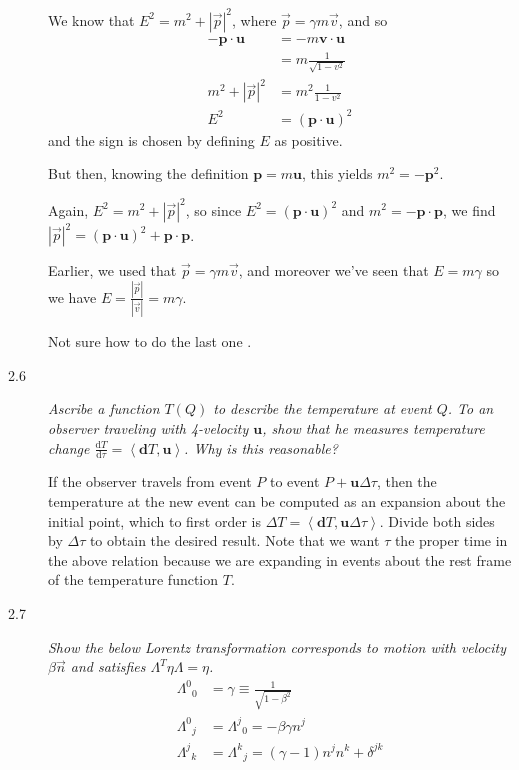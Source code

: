 \documentclass[12pt]{report}
\newcommand{\rd}[2]{\frac{\mathrm{d}#1}{\mathrm{d}#2}}
\newcommand{\abs}[1]{\left|#1\right|}
\newcommand{\bm}[1]{\boldsymbol{\mathbf{#1}}}
\newcommand{\expvalue}[1]{\left<#1\right>}
\begin{document}
\begin{description}
        We know that $E^2 = m^2 + \abs{\vec{p}}^2$, where $\vec{p} = \gamma m
        \vec{v}$, and so
        \begin{align}
            -\bm{p} \cdot \bm{u} &= -m\bm{v} \cdot \bm{u}
                \nonumber\\
            &= m\frac{1}{\sqrt{1 - v^2}} \nonumber\\
            m^2 + \abs{\vec{p}}^2 &= m^2\frac{1}{1-v^2} \nonumber\\
            E^2 &= (\bm{p} \cdot \bm{u})^2
        \end{align}
        and the sign is chosen by defining $E$ as positive.

        But then, knowing the definition $\bm{p} = m\bm{u}$, this yields
        $m^2 = -\bm{p}^2$.

        Again, $E^2 = m^2 + \abs{\vec{p}}^2$, so since
        $E^2 = (\bm{p} \cdot \bm{u})^2$ and $m^2 = -\bm{p} \cdot
        \bm{p}$, we find
        $\abs{\vec{p}}^2 = (\bm{p} \cdot \bm{u})^2 + \bm{p} \cdot
        \bm{p}$.

        Earlier, we used that $\vec{p} = \gamma m \vec{v}$, and moreover we've
        seen that $E = m\gamma$ so we have $E =
        \frac{\abs{\vec{p}}}{\abs{\vec{v}}} = m\gamma$.

        Not sure how to do the last one \frownie.

    \item[2.6] \emph{Ascribe a function $T(Q)$ to describe the temperature at
        event $Q$. To an observer traveling with 4-velocity $\bm{u}$, show
        that he measures temperature change $\rd{T}{\tau} =
        \expvalue{\bm{d}T, \bm{u}}$. Why is this reasonable?}

        If the observer travels from event $P$ to event $P +
        \bm{u}\Delta\tau$, then the temperature at the new event can be
        computed as an expansion about the initial point, which to first order
        is $\Delta T = \expvalue{\bm{d}T, \bm{u}\Delta \tau}$. Divide
        both sides by $\Delta \tau$ to obtain the desired result. Note that we
        want $\tau$ the proper time in the above relation because we are
        expanding in events about the rest frame of the temperature function
        $T$.

    \item[2.7] \emph{Show the below Lorentz transformation corresponds to motion
        with velocity $\beta \vec{n}$ and satisfies $\Lambda^T\eta \Lambda =
        \eta$.}
        \begin{align}
            {\Lambda^0}_0 &= \gamma \equiv \frac{1}{\sqrt{1 - \beta^2}}\\
            {\Lambda^0}_j &= {\Lambda^j}_0 = -\beta\gamma n^j\\
            {\Lambda^j}_k &= {\Lambda^k}_j = (\gamma - 1)n^jn^k + \delta^{jk}
        \end{align}


\end{description}
\end{document}

